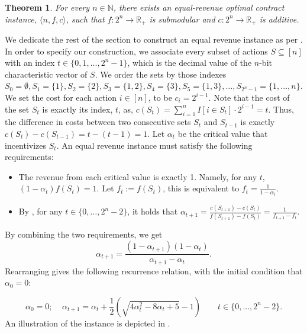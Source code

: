 \documentclass[11pt]{article}
\newtheorem{theorem}{Theorem}
\newcommand{\reals}{\mathbb{R}}
\newcommand{\instance}{\langle n, f, c \rangle}
\begin{document}
\begin{theorem}\label{thm:eqRev}
For every $n \in \mathbb{N}$, there exists an equal-revenue optimal contract instance, $\instance$, such that $f:2^n \to \reals_+$ is submodular and $c:2^n \to \reals_+$ is additive.
\end{theorem}
We dedicate the rest of the section to construct an equal revenue instance as per .
In order to specify our construction, we associate every subset of actions $S \subseteq [n]$ with an index $t \in \{0,1,...,2^n-1\}$, which is the decimal value of the $n$-bit characteristic vector of $S$. We order the sets by those indexes $S_0 = \emptyset, S_1=\{1\}, S_2=\{2\}, S_3=\{1,2\},S_4=
\{3\}, S_5=\{1,3\},\ldots,S_{2^n-1} = \{1,...,n\}$. 
We set the cost for each action $i \in [n]$, to be $c_i = 2^{i-1}$. Note that the cost of the set $S_t$ is exactly its index, $t$, as, $c(S_t) = \sum_{i=1}^{n} I[i\in S_t] \cdot 2^{i-1} = t$.
Thus, the difference in costs between two consecutive sets $S_t$ and $S_{t-1}$ is exactly $c(S_t) - c(S_{t-1}) = t - (t-1) = 1$.
Let $\alpha_t$ be the critical value that incentivizes $S_t$. 
An equal revenue instance must satisfy the following requirements:
\begin{itemize}
    \setlength\itemsep{-0.25em}
    \item The revenue from each critical value is exactly 1. Namely, for any $t$, $(1-\alpha_t)f(S_t) = 1$. Let $f_t := f(S_t)$, this is equivalent to 
    $f_t = \frac{1}{1-\alpha_t}$.   
    \item By , for any $t \in \{0,\dots,2^n-2\}$, it holds that $\alpha_{t+1} = \frac{c(S_{t+1})-c(S_t)}{f(S_{t+1})-f(S_t) }=\frac{1}{f_{t+1}-f_t}$. 
\end{itemize}
By combining the two requirements, we get
\begin{equation}\label{eq:RR_t}
\alpha_{t+1} = \frac{(1-\alpha_{t+1})(1-\alpha_t)}{\alpha_{t+1}-\alpha_t}.    
\end{equation}
Rearranging gives the following recurrence relation, with the initial condition that $\alpha_0 = 0$:

\begin{equation}\label{eqn:alphaRR}
\alpha_0 = 0; \;\;\;\; \alpha_{t+1} = \alpha_t + \frac{1}{2}\left(\sqrt{4\alpha_t^2 - 8\alpha_t + 5} - 1\right) \qquad t \in \{0,...,2^n-2\}.    
\end{equation}
An illustration of the instance is depicted in .
\end{document}
